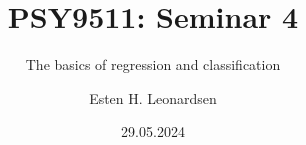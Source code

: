 \documentclass[10pt]{beamer}
\title{PSY9511: Seminar 4}
\subtitle{The basics of regression and classification}
\author{Esten H. Leonardsen}
\date{29.05.2024}
\begin{document}
	\begin{frame}
	 	\titlepage
	\end{frame}



\end{document}

